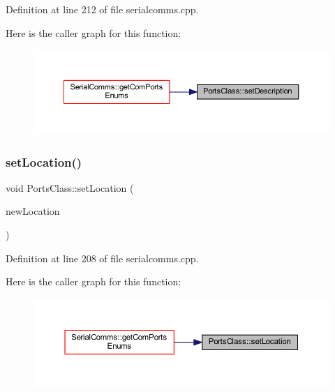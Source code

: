 Definition at line 212 of file serialcomms.\+cpp.

Here is the caller graph for this function\+:
\nopagebreak
\begin{figure}[H]
\begin{center}
\leavevmode
\includegraphics[width=350pt]{classPortsClass_a2f06af1956265d0079be56b9b85c3a0f_icgraph}
\end{center}
\end{figure}
\mbox{\label{classPortsClass_a1a5f185d5b9db6407d943187778f3782}} 
\subsubsection{\texorpdfstring{setLocation()}{setLocation()}}
{\footnotesize\ttfamily void Ports\+Class\+::set\+Location (\begin{DoxyParamCaption}\item[{Q\+String}]{new\+Location }\end{DoxyParamCaption})}



Definition at line 208 of file serialcomms.\+cpp.

Here is the caller graph for this function\+:
\nopagebreak
\begin{figure}[H]
\begin{center}
\leavevmode
\includegraphics[width=350pt]{classPortsClass_a1a5f185d5b9db6407d943187778f3782_icgraph}
\end{center}
\end{figure}
\mbox{\label{classPortsClass_a0ac6d29d8868c2ebde8811d0249d7e41}} 
